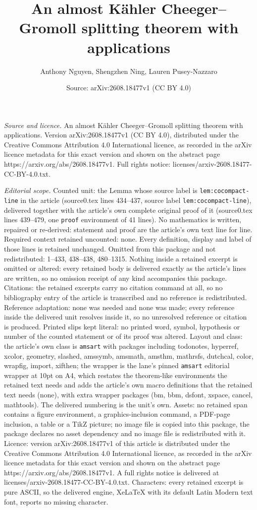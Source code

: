 \documentclass[10pt,a4paper]{amsart}
\title[An almost K\"ahler Cheeger--Gromoll splitting theorem with a]{An almost K\"ahler Cheeger--Gromoll splitting theorem with applications}
\author{Anthony Nguyen, Shengzhen Ning, Lauren Pusey-Nazzaro}
\date{Source: arXiv:2608.18477v1 (CC BY 4.0)}
\begin{document}
\maketitle

\noindent\emph{Source and licence.} An almost K\"ahler Cheeger--Gromoll splitting theorem with applications. Version arXiv:2608.18477v1 (CC BY 4.0), distributed under the Creative Commons Attribution 4.0 International licence, as recorded in the arXiv licence metadata for this exact version and shown on the abstract page https://arxiv.org/abs/2608.18477v1. Full rights notice: licenses/arxiv-2608.18477-CC-BY-4.0.txt.\par\smallskip

\noindent\textit{Editorial scope.} Counted unit: the Lemma whose source label is \texttt{lem:cocompact-line} in the article (source0.tex lines 434--437, source label \texttt{lem:cocompact-line}), delivered together with the article's own complete original proof of it (source0.tex lines 439--479, one \texttt{proof} environment of 41 lines). No mathematics is written, repaired or re-derived: statement and proof are the article's own text line for line. Required context retained uncounted: none. Every definition, display and label of those lines is retained unchanged. Omitted from this package and not redistributed: 1--433, 438--438, 480--1315. Nothing inside a retained excerpt is omitted or altered: every retained body is delivered exactly as the article's lines are written, so no omission receipt of any kind accompanies this package. Citations: the retained excerpts carry no citation command at all, so no bibliography entry of the article is transcribed and no reference is redistributed. Reference adaptation: none was needed and none was made; every reference inside the delivered unit resolves inside it, so no unresolved reference or citation is produced. Printed slips kept literal: no printed word, symbol, hypothesis or number of the counted statement or of its proof was altered. Layout and class: the article's own class is \texttt{amsart} with packages including todonotes, hyperref, xcolor, geometry, slashed, amssymb, amsmath, amsthm, mathrsfs, dutchcal, color, wrapfig, import, xifthen; the wrapper is the lane's pinned \texttt{amsart} editorial wrapper at 10pt on A4, which restates the theorem-like environments the retained text needs and adds the article's own macro definitions that the retained text needs (none), with extra wrapper packages (bm, bbm, dsfont, xspace, cancel, mathtools). The delivered numbering is the unit's own. Assets: no retained span contains a figure environment, a graphics-inclusion command, a PDF-page inclusion, a table or a TikZ picture; no image file is copied into this package, the package declares no asset dependency and no image file is redistributed with it. Licence: version arXiv:2608.18477v1 of this article is distributed under the Creative Commons Attribution 4.0 International licence, as recorded in the arXiv licence metadata for this exact version and shown on the abstract page https://arxiv.org/abs/2608.18477v1. A full rights notice is delivered at licenses/arxiv-2608.18477-CC-BY-4.0.txt. Characters: every retained excerpt is pure ASCII, so the delivered engine, XeLaTeX with its default Latin Modern text font, reports no missing character.
\end{document}
